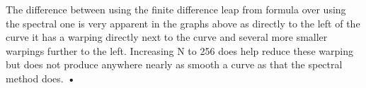\documentclass[12pt]{article}
\begin{document}
The difference between using the finite difference leap from formula over using the spectral one is very apparent in the graphs above as directly to the left of the curve it has a warping directly next to the curve and several more smaller warpings further to the left. Increasing N to 256 does help reduce these warping but does not produce anywhere nearly as smooth a curve as that the spectral method does.
\textbf{•}\\
\end{document}
